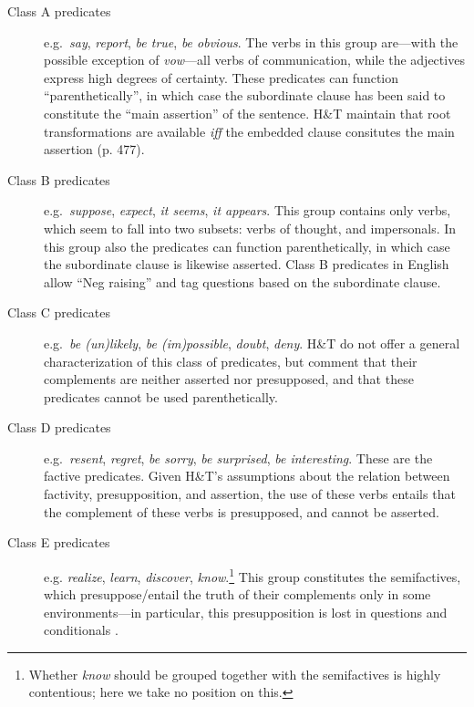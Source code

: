 \documentclass[output=paper]{LSP/langsci}
\begin{document}
\begin{description}
\item[Class A predicates] e.g.\ \textit{say}, \textit{report}, \textit{be true}, \textit{be obvious}. The verbs in this group are---with the possible exception of \textit{vow}---all verbs of communication, while the adjectives express high degrees of certainty. These predicates can function ``parenthetically'', in which case the subordinate clause has been said to constitute the ``main assertion'' of the sentence. H\&T maintain that root transformations are available \textit{iff} the embedded clause consitutes the main assertion (p. 477). 
\item[Class B predicates] e.g.\  \textit{suppose}, \textit{expect}, \textit{it seems},  \textit{it appears}. This group contains only verbs, which seem to fall into two subsets: verbs of thought, and impersonals. In this group also the predicates can function parenthetically, in which case the subordinate clause is likewise asserted. Class B predicates in English allow ``Neg raising'' and tag questions based on the subordinate clause.
\item[Class C predicates] e.g.\ \textit{be (un)likely}, \textit{be (im)possible}, \textit{doubt}, \textit{deny}.  H\&T do not offer a general characterization of this class of predicates, but comment that their complements are neither asserted nor presupposed, and that these predicates cannot be used parenthetically. 
\item[Class D predicates] e.g.\ \textit{resent}, \textit{regret}, \textit{be sorry}, \textit{be surprised}, \textit{be interesting}. These are the factive predicates. Given H\&T's assumptions about the relation between factivity, presupposition, and assertion, the use of these verbs entails that the complement of these verbs is presupposed, and cannot be asserted.
\item[Class E predicates] e.g. \textit{realize}, \textit{learn}, \textit{discover}, \textit{know}.\footnote{Whether \textit{know} should be grouped together with the semifactives is highly contentious; here we take no position on this.}  This group constitutes the semifactives, which presuppose/entail the truth of their complements only in some environments---in particular, this presupposition is lost in questions and conditionals \citep{kiparsky-kiparsky70}. 
 
\end{description}
\end{document}
